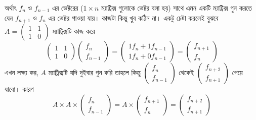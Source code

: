 অর্থাৎ $f_{n}$ ও $f_{n - 1}$ এর ভেক্টরের ($1 \times n$ ম্যাট্রিক্স গুলোকে ভেক্টর বলা হয়) সাথে এমন একটি ম্যাট্রিক্স গুন করতে যেন $f_{n + 1}$ ও $f_{n}$ এর ভেক্টর পাওয়া যায়। কাজটা কিন্তু খুব কঠিন না। একটু চেষ্টা করলেই বুঝবে $A = \begin{pmatrix}
  1 & 1\\ 
  1 & 0
\end{pmatrix}$  ম্যাট্রিক্সটি কাজ 
করে 
$$
\begin{pmatrix}
1 & 1 \\
1 & 0
\end{pmatrix} 
\begin{pmatrix}
f_{n} \\
f_{n - 1}
\end{pmatrix}
= 
\begin{pmatrix}
1f_{n} + 1f_{n - 1} \\
1f_{n} + 0f_{n - 1}
\end{pmatrix}
=
\begin{pmatrix}
f_{n + 1} \\
f_{n}
\end{pmatrix}
$$ 
এখন লক্ষ্য কর, $A$ ম্যাট্রিক্সটি যদি দুইবার গুন করি তাহলে কিন্তু $\begin{pmatrix}
  f_n\\ 
  f_{n - 1}
\end{pmatrix}$ থেকেই $\begin{pmatrix}
  f_{n + 2}\\ 
  f_{n + 1}
\end{pmatrix}$ পেয়ে যাবো।  কারণ 
$$
A \times A \times
\begin{pmatrix}
f_{n} \\
f_{n - 1}
\end{pmatrix}
= 
A \times
\begin{pmatrix}
f_{n + 1} \\
f_{n}
\end{pmatrix}
=
\begin{pmatrix}
f_{n + 2} \\
f_{n + 1}
\end{pmatrix}
$$ 

